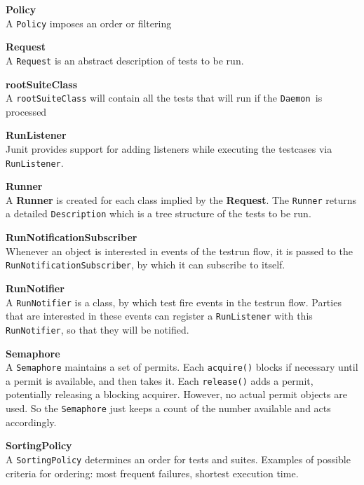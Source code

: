 \documentclass[i2]{oss}
\newcommand{\class}[1]{\texttt{#1}}
\newcommand{\method}[1]{\texttt{#1}}
\newcommand{\Deamon}{\class{Daemon  }}
\newcommand{\gloss}[1]{\textbf{#1}}
\begin{document}
\begin{description}
\item \gloss{Policy} \\
A \class{Policy} imposes an order or filtering 

\item \gloss{Request} \\
A \class{Request} is an abstract description of tests to be run. 

\item \gloss{rootSuiteClass}\\
A \class{rootSuiteClass} will contain all the tests that will run if the \Deamon is processed

\item \gloss{RunListener} \\
Junit provides support for adding listeners while executing the testcases via \class{RunListener}. 

\item \gloss{Runner} \\  A \gloss{Runner} is created for each class implied by the \gloss{Request}. The \class{Runner} returns a detailed \class{Description} which is a tree structure of the tests to be run.

\item \gloss{RunNotificationSubscriber} \\
Whenever an object is interested in events of the testrun flow, it is passed to the \class{RunNotificationSubscriber}, by which it can subscribe to itself.


\item \gloss{RunNotifier} \\
A \class{RunNotifier} is a class, by which test fire events in the testrun flow.
Parties that are interested in these events can register a \class{RunListener} with this \class{RunNotifier}, so that they will be notified.

\item \gloss{Semaphore} \\
A \class{Semaphore} maintains a set of permits. Each \method{acquire()} blocks if necessary until a permit is available, and then takes it. Each \method{release()} adds a permit, potentially releasing a blocking acquirer. However, no actual permit objects are used. So the \class{Semaphore} just keeps a count of the number available and acts accordingly.

\item \gloss{SortingPolicy}\\
 A \class{SortingPolicy} determines an order for tests and suites. Examples of possible criteria for ordering: most frequent failures, shortest execution time.


\end{description}
\end{document}
